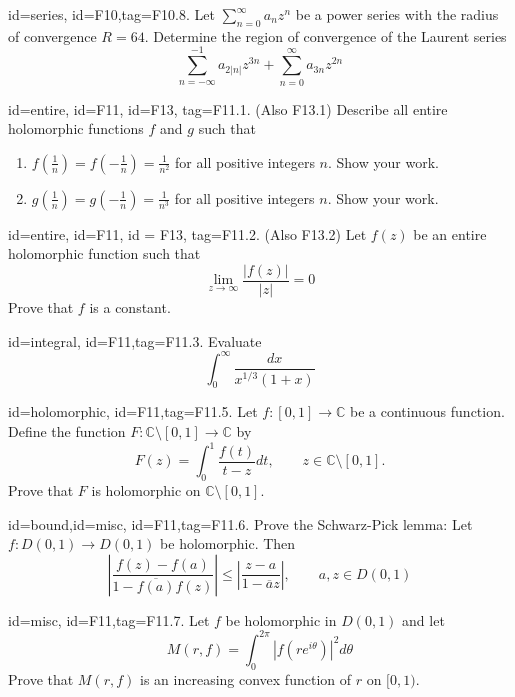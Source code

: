 \documentclass[12pt,letterpaper]{article}
\begin{document}
{\item[id=series, id=F10,tag=F10.8.]
Let $\sum_{n=0}^{\infty} a_n z^n$ be a power series with the radius of convergence $R = 64$. Determine the region of convergence of the Laurent series
\[
	\sum_{n=-\infty}^{-1} a_{2| n |} z^{3n} + \sum_{n=0}^{\infty} a_{3n} z^{2n}
\]

\item[id=entire, id=F11, id=F13, tag=F11.1.]
(Also F13.1) Describe all entire holomorphic functions $f$ and $g$ such that
\begin{enumerate}[label=(\alph*)]\onlyitems
\item $f\left(\frac{1}{n}\right) = f\left(-\frac{1}{n}\right) = \frac{1}{n^2}$ for all positive integers $n$. Show your work.
\item $g\left(\frac{1}{n}\right) = g\left(-\frac{1}{n}\right) = \frac{1}{n^3}$ for all positive integers $n$. Show your work.
\end{enumerate}

\item[id=entire, id=F11, id = F13, tag=F11.2.]
(Also F13.2) Let $f(z)$ be an entire holomorphic function such that
\[
	\lim_{z\rightarrow \infty} \frac{| f(z) |}{| z |} = 0
\]
Prove that $f$ is a constant.

\item[id=integral, id=F11,tag=F11.3.]
Evaluate
\[
	\int_{0}^{\infty} \frac{dx}{x^{1/3}(1+x)}
\]

\item[id=holomorphic, id=F11,tag=F11.5.]
Let $f : [0,1] \rightarrow \mathbb{C}$ be a continuous function. Define the function $F : \mathbb{C} \setminus [0,1] \rightarrow \mathbb{C}$ by
\[
	F(z) = \int_{0}^{1} \frac{f(t)}{t-z} dt, \qquad z \in \mathbb{C} \setminus [0,1].
\]
Prove that $F$ is holomorphic on $\mathbb{C} \setminus [0,1]$.

\item[id=bound,id=misc, id=F11,tag=F11.6.]
Prove the Schwarz-Pick lemma: Let $f : D(0,1) \rightarrow D(0,1)$ be holomorphic. Then
\[
	\left| \frac{f(z) - f(a)}{1 - \overline{f(a)}f(z)} \right| \le \left| \frac{z-a}{1 - \overline{a}z} \right|, \qquad a,z \in D(0,1)
\]

\item[id=misc, id=F11,tag=F11.7.]
Let $f$ be holomorphic in $D(0,1)$ and let
\[
	M(r,f) = \int_{0}^{2\pi} | f(re^{i\theta}) |^2 d\theta
\]
Prove that $M(r,f)$ is an increasing convex function of $r$ on $[0,1)$.

}
\end{document}
